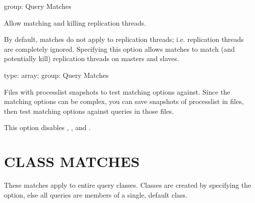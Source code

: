 \documentclass[letterpaper,10pt,english]{sphinxmanual}
\begin{document}
\begin{fulllineitems}
\label{\detokenize{mariadb-kill:cmdoption-mariadb-kill-replication-threads}}
group: Query Matches

Allow matching and killing replication threads.

By default, matches do not apply to replication threads; i.e. replication
threads are completely ignored.  Specifying this option allows matches to
match (and potentially kill) replication threads on masters and slaves.

\end{fulllineitems}


\begin{fulllineitems}
\label{\detokenize{mariadb-kill:cmdoption-mariadb-kill-test-matching}}
type: array; group: Query Matches

Files with processlist snapshots to test matching options against.  Since
the matching options can be complex, you can save snapshots of processlist
in files, then test matching options against queries in those files.

This option disables {\hyperref[\detokenize{mariadb-kill:cmdoption-mariadb-kill-run-time}]{}}, {\hyperref[\detokenize{mariadb-kill:cmdoption-mariadb-kill-interval}]{}},
and .

\end{fulllineitems}



\section{CLASS MATCHES}
\label{\detokenize{mariadb-kill:class-matches}}
These matches apply to entire query classes.  Classes are created by specifying
the {\hyperref[\detokenize{mariadb-kill:cmdoption-mariadb-kill-group-by}]{}} option, else all queries are members of a single, default
class.
\end{document}
